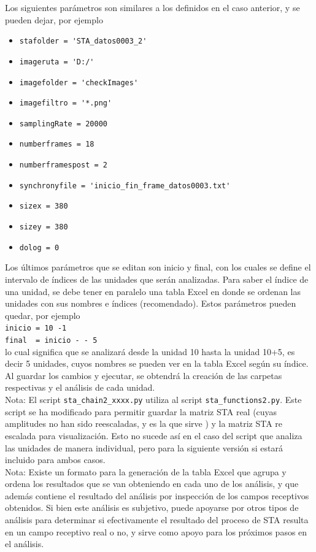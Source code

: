 \documentclass[10pt]{article}
\begin{document}
Los siguientes parámetros son similares a los definidos en el caso anterior, y se pueden dejar, por ejemplo \\
\begin{itemize}
\item \verb+stafolder = 'STA_datos0003_2'+
\item \verb+imageruta = 'D:/'+
\item \verb+imagefolder = 'checkImages'+
\item \verb+imagefiltro = '*.png'+
\item \verb+samplingRate = 20000 +
\item \verb+numberframes = 18+
\item \verb+numberframespost = 2+
\item \verb+synchronyfile = 'inicio_fin_frame_datos0003.txt'+
\item \verb+sizex = 380 +
\item \verb+sizey = 380 +
\item \verb+dolog = 0+
\end{itemize}

Los últimos parámetros que se editan son inicio y final, con los cuales se define el intervalo de índices de las unidades que serán analizadas. Para saber el índice de una unidad, se debe tener en paralelo una tabla Excel en donde se ordenan las unidades con sus nombres e índices (recomendado). Estos parámetros pueden quedar, por ejemplo \\
\verb+inicio = 10 -1+ \\
\verb+final  = inicio - - 5+ \\
lo cual significa que se analizará desde la unidad 10 hasta la unidad 10+5, es decir 5 unidades, cuyos nombres se pueden ver en la tabla Excel según su índice. Al guardar los cambios y ejecutar, se obtendrá la creación de las carpetas respectivas y el análisis de cada unidad.\\

Nota: El script \verb+sta_chain2_xxxx.py+ utiliza al script \verb+sta_functions2.py+. Este script se ha modificado para permitir guardar la matriz STA real (cuyas amplitudes no han sido reescaladas, y es la que sirve ) y la matriz STA re escalada para visualización. Esto no sucede así en el caso del script que analiza las unidades de manera individual, pero para la siguiente versión si estará incluido para ambos casos. \\

Nota: Existe un formato para la generación de la tabla Excel que agrupa y ordena los resultados que se van obteniendo en cada uno de los análisis, y que además contiene el resultado del análisis por inspección de los campos receptivos obtenidos. Si bien este análisis es subjetivo, puede apoyarse por otros tipos de análisis para determinar si efectivamente el resultado del proceso de STA resulta en un campo receptivo real o no, y sirve como apoyo para los próximos pasos en el análisis. \\
\end{document}
